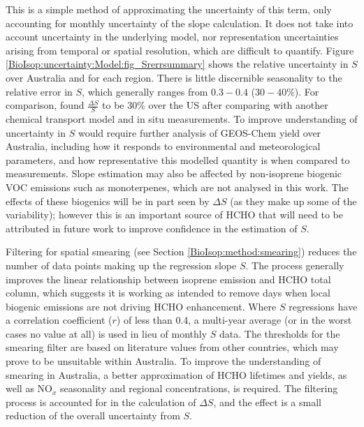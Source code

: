     
    This is a simple method of approximating the uncertainty of this term, only accounting for monthly uncertainty of the slope calculation.
    It does not take into account uncertainty in the underlying model, nor representation uncertainties arising from temporal or spatial resolution, which are difficult to quantify.
    Figure \ref{BioIsop:uncertainty:Model:fig_Srerrsummary} shows the relative uncertainty in $S$ over Australia and for each region.
    There is little discernible seasonality to the relative error in $S$, which generally ranges from $0.3-0.4$ ($30-40\%$).
    For comparison, \textcite{Palmer2006} found $\frac{\Delta S}{S}$ to be 30\% over the US after comparing with another chemical transport model and in situ measurements.
    To improve understanding of uncertainty in $S$ would require further analysis of GEOS-Chem yield over Australia, including how it responds to environmental and meteorological parameters, and how representative this modelled quantity is when compared to measurements.
    Slope estimation may also be affected by non-isoprene biogenic VOC emissions such as monoterpenes, which are not analysed in this work. 
    The effects of these biogenics will be in part seen by $\Delta S$ (as they make up some of the variability); however this is an important source of HCHO that will need to be attributed in future work to improve confidence in the estimation of $S$. 
    
    
    Filtering for spatial smearing (see Section \ref{BioIsop:method:smearing}) reduces the number of data points making up the regression slope $S$. 
    The process generally improves the linear relationship between isoprene emission and HCHO total column, which suggests it is working as intended to remove days when local biogenic emissions are not driving HCHO enhancement.
    Where $S$ regressions have a correlation coefficient ($r$) of less than 0.4, a multi-year average (or in the worst cases no value at all) is used in lieu of monthly $S$ data.
    The thresholds for the smearing filter are based on literature values from other countries, which may prove to be unsuitable within Australia.
    To improve the understanding of smearing in Australia, a better approximation of HCHO lifetimes and yields, as well as NO$_x$ seasonality and regional concentrations, is required.
    The filtering process is accounted for in the calculation of $\Delta S$, and the effect is a small reduction of the overall uncertainty from $S$.
    
